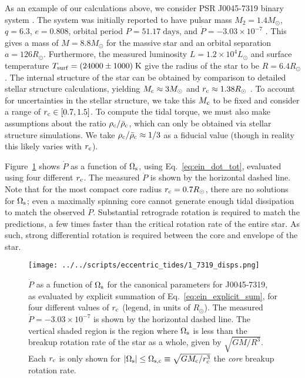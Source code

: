 \documentclass[
        fleqn,
        usenatbib,
    ]{mnras}
\newcommand*{\abs}[1]{\left|#1\right|}
\begin{document}
As an example of our calculations above, we consider PSR J0045-7319 binary
system \citep{bell1995psr}. The system was initially reported to have pulsar
mass $M_2 = 1.4M_{\odot}$, $q = 6.3$, $e = 0.808$, orbital period $P =
51.17\;\mathrm{days}$, and $\dot{P} = -3.03\times 10^{-7}$
\citep{kaspi1996params}. This gives a mass of $M = 8.8M_{\odot}$ for the massive
star and an orbital separation $a = 126R_{\odot}$. Furthermore, the measured
luminosity $L = 1.2 \times 10^4L_{\odot}$ and surface temperature $T_{\rm surf}
= (24000 \pm 1000)\;\mathrm{K}$ give the radius of the star to be $R =
6.4R_{\odot}$ \citep{kaspi1996params}. The internal structure of the star can be
obtained by comparison to detailed stellar structure calculations, yielding
$M_{\rm c} \approx 3M_{\odot}$ and $r_{\rm c} \approx 1.38R_{\odot}$
\citep{kumar1998}. To account for uncertainties in the stellar structure, we
take this $M_{\rm c}$ to be fixed and consider a range of $r_{\rm c} \in [0.7,
1.5]$. To compute the tidal torque, we must also make assumptions about the
ratio $\rho_{\rm c} / \bar{\rho}_{\rm c}$, which can only be obtained via
stellar structure simulations. We take $\rho_{\rm c} / \bar{\rho}_{\rm c}
\approx 1/3$ as a fiducial value (though in reality this likely varies with
$r_{\rm c}$).

Figure~\ref{fig:j0045_fid} shows $\dot{P}$ as a function of $\Omega_{\rm s}$,
using Eq.~\eqref{eq:ein_dot_tot}, evaluated using four different $r_{\rm c}$.
The measured $\dot{P}$ is shown by the horizontal dashed line. Note that for the
most compact core radius $r _{\rm c} = 0.7R_{\odot}$, there are no solutions for
$\Omega_{\rm s}$; even a maximally spinning core cannot generate enough tidal
dissipation to match the observed $\dot{P}$. Substantial retrograde rotation is
required to match the predictions, a few times faster than the critical rotation
rate of the entire star. As such, strong differential rotation is required
between the core and envelope of the star.
\begin{figure}
    \centering
    \texttt{[image: ../../scripts/eccentric\_tides/1\_7319\_disps.png]}
    \caption{$\dot{P}$ as a function of $\Omega_{\rm s}$ for the canonical
    parameters for J0045-7319, as evaluated by explicit summation of
    Eq.~\eqref{eq:ein_explicit_sum}, for four different values of $r_{\rm c}$
    (legend, in units of $R_{\odot}$). The measured $\dot{P} = -3.03\times
    10^{-7}$ is shown by the horizontal dashed line. The vertical shaded region
    is the region where $\Omega_{\rm s}$ is less than the breakup rotation rate
    of the star as a whole, given by $\sqrt{GM / R^3}$. Each $r_{\rm c}$ is only
    shown for $\abs{\Omega_{\rm s}} \leq \Omega_{\rm s, c} \equiv \sqrt{GM_{\rm
    c} / r_{\rm c}^3}$ the \emph{core} breakup rotation rate.
    }\label{fig:j0045_fid}
\end{figure}
\end{document}
